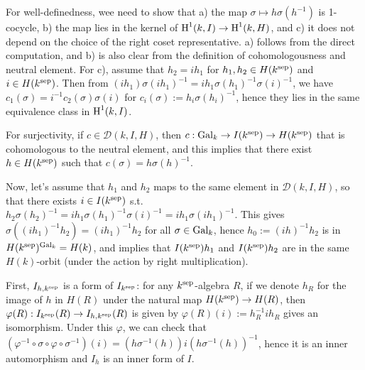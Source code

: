 \begin{problem}
For well-definedness, wee need to show that a) the map $\sigma \mapsto h\sigma(h^{-1})$ is 1-cocycle,
b) the map lies in the kernel of $\operatorname{\mathrm{H}}^{1}(k, I) \to \operatorname{\mathrm{H}}^1(k, H)$, and c)
it does not depend on the choice of the right coset representative.
a) follows from the direct computation, and b) is also clear from the definition of cohomologousness and neutral element.
For c), assume that $h_2 = ih_1$ for $h_1, h_2 \in H(k^{\operatorname{\mathrm{sep}}})$ and $i \in H(k^{\operatorname{\mathrm{sep}}})$.
Then from $(ih_1)\sigma(ih_1)^{-1} = i h_1 \sigma(h_1)^{-1} \sigma(i)^{-1}$, we have $c_1(\sigma) = i^{-1} c_{2}(\sigma) \sigma(i)$
for $c_i(\sigma):= h_i \sigma(h_i)^{-1}$, hence they lies in the same equivalence class in $\operatorname{\mathrm{H}}^{1}(k, I)$.

For surjectivity, if $c \in \mathcal{D}(k, I, H)$, then $c: \operatorname{\mathrm{Gal}}_k \to I(k^{\operatorname{\mathrm{sep}}}) \to H(k^{\operatorname{\mathrm{sep}}})$ that is cohomologous to the neutral element,
and this implies that there exist $h \in H(k^{\operatorname{\mathrm{sep}}})$ such that $c(\sigma) = h\sigma(h)^{-1}$.

Now, let's assume that $h_1$ and $h_2$ maps to the same element in $\mathcal{D}(k, I, H)$, so that there exists $i \in I(k^{\operatorname{\mathrm{sep}}})$ s.t.
$h_{2}\sigma(h_{2})^{-1} = ih_{1}\sigma(h_{1})^{-1}\sigma(i)^{-1} = ih_{1} \sigma(ih_1)^{-1}$.
This gives $\sigma((ih_{1})^{-1}h_{2}) = (ih_{1})^{-1}h_{2}$ for all $\sigma \in \operatorname{\mathrm{Gal}}_k$, hence $h_{0}:=(ih)^{-1}h_{2}$ is in $H(k^{\operatorname{\mathrm{sep}}})^{\operatorname{\mathrm{Gal}}_k} = H(k)$,
and implies that $I(k^{\operatorname{\mathrm{sep}}})h_1$ and $I(k^{\operatorname{\mathrm{sep}}})h_2$ are in the same $H(k)$-orbit (under the action by right multiplication).

\end{problem}

\begin{problem}
First, $I_{h, k^{\operatorname{\mathrm{sep}}}}$ is a form of $I_{k^{\operatorname{\mathrm{sep}}}}$: for any $k^{\operatorname{\mathrm{sep}}}$-algebra $R$, if we denote $h_R$ for the
image of $h$ in $H(R)$ under the natural map $H(k^{\operatorname{\mathrm{sep}}}) \to H(R)$, then $\varphi(R): I_{k^{\operatorname{\mathrm{sep}}}}(R) \to I_{h, k^{\operatorname{\mathrm{sep}}}}(R)$
is given by $\varphi(R)(i):= h_{R}^{-1}ih_{R}$ gives an isomorphism.
Under this $\varphi$, we can check that $(\varphi^{-1}\circ \sigma \circ \varphi \circ \sigma^{-1})(i) = (h\sigma^{-1}(h))i (h\sigma^{-1}(h))^{-1}$,
hence it is an inner automorphism and $I_{h}$ is an inner form of $I$.
\end{problem}

\begin{problem} \notfinish
\end{problem}


